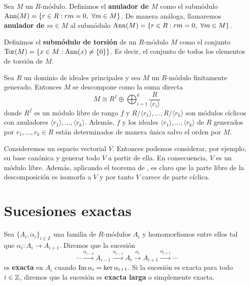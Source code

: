 \begin{definicion}
	Sea $M$ un $R$-módulo. Definimos el \textbf{anulador de $M$} como el submódulo
	$\ann(M) = \{r \in R : rm=0, \ \forall m \in M\}$. De manera análoga, llamaremos
	\textbf{anulador de $m \in M$} al submódulo
	$\ann(M) = \{r \in R : rm=0, \ \forall m \in M\}$.
\end{definicion}

\begin{definicion}
	Definimos el \textbf{submódulo de torsión} de un $R$-módulo $M$ como el
	conjunto $\operatorname{Tor}(M)= \{x \in M : \operatorname{Ann}(x) \neq \{0\}\}$. Es decir, el conjunto de
	todos los elementos de torsión de $M$.
\end{definicion}
\begin{teorema}
	 \label{teo:desc-cicl-prim} Sea $R$ un dominio
	de ideales principales y sea $M$ un $R$-módulo finitamente generado. Entonces
	$M$ se descompone como la suma directa
	\[
	M \cong R^{f}\oplus \bigoplus_{i = 1}^{k}\frac{R}{\langle r_{i}\rangle}
	\]
	donde $R^{f}$ es un módulo libre de rango $f$ y
	$R/\langle r_{1}\rangle, \ldots, R/\langle r_{k}\rangle$ son módulos cíclicos
	con anuladores $\langle r_{1}\rangle, \ldots, \langle r_{k}\rangle$. Además,
	$f$ y los ideales $\langle r_{1}\rangle, \ldots, \langle r_{k}\rangle$ de $R$
	generados por $r_{1}, \ldots, r_{k}\in R$ están determinados de manera única
	salvo el orden por $M$.
\end{teorema}
\begin{ejemplo}
	Consideremos un espacio vectorial $V$. Entonces podemos considerar, por ejemplo,
	su base canónica y generar todo $V$ a partir de ella. En consecuencia, $V$ es
	un módulo libre. Además, aplicando el teorema de ,
	es claro que la parte libre de la descomposición es isomorfa a $V$ y por tanto
	$V$ carece de parte cíclica.
\end{ejemplo}

\section{Sucesiones exactas}

\begin{definicion}
	Sea $\{A_{i}, \alpha_{i}\}_{i \in \mathbb{Z}}$ una familia de $R$-módulos $A_{i}$
	y homomorfismos entre ellos tal que $\alpha_{i}: A_{i}\rightarrow A_{i+1}$.
	Diremos que la sucesión
	\[
	\cdots \xrightarrow{\alpha_{i-2}}A_{i-1}\xrightarrow{\alpha_{i-1}}A_{i}\xrightarrow
	{\alpha_{i}}A_{i+1}\xrightarrow{\alpha_{i+1}}\cdots
	\]
	es \textbf{exacta} en $A_{i}$ cuando $\operatorname{Im} \alpha_{i}= \ker \alpha_{i+1}$. Si
	la sucesión es exacta para todo $i \in \mathbb{Z}$, diremos que la sucesión es \textbf{exacta
		larga} o simplemente exacta.
\end{definicion}

